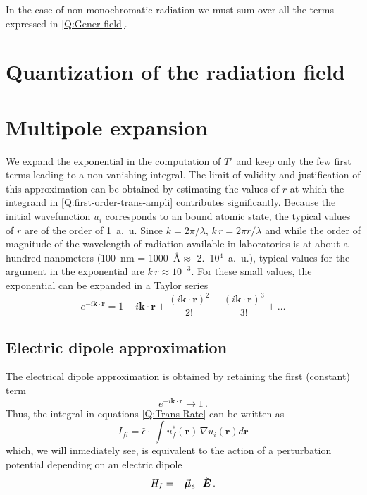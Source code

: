 In the case of non-monochromatic radiation we must sum over all the terms expressed in \ref{Q:Gener-field}.

\section{Quantization of the radiation field}


\section{Multipole expansion}
\label{S:Multi-expan}

We expand the exponential in the computation of $T'$ and keep only the few first terms leading to a non-vanishing integral. The limit of validity and justification of this approximation can be obtained by estimating the values of $r$ at which the integrand in \ref{Q:first-order-trans-ampli} contributes significantly.  
%
Because the initial wavefunction $u_{i}$ corresponds to an bound atomic state, the typical values of $r$ are of the order of 1~a.~u. Since $k = 2 \pi/\lambda$, $k\,r = 2 \pi r/ \lambda$ and while the order of magnitude of the wavelength of radiation available in laboratories is at about a hundred nanometers (100~nm = 1000~\AA $\approx$ 2.~10$^{4}$~a.~u.), typical values for the argument in the exponential are $k\,r\approx 10^{-3}$. For these small values, the exponential can be expanded in a Taylor series
\[
e^{-i \bm{k} \cdot \bm{r}} = 1 - i \bm{k} \cdot \bm{r} + \frac{\left( i \bm{k} \cdot \bm{r}\right)^{2}}{2!} - \frac{\left(
i \bm{k} \cdot \bm{r}\right)^{3}}{3!} + \dots
\]

\subsection{Electric dipole approximation}

The electrical dipole approximation is obtained by retaining the first (constant) term
\[ e^{-i \bm{k} \cdot \bm{r}} \to 1 \, . \]
%
Thus, the integral in equations \ref{Q:Trans-Rate} can be written as
%
\[
I_{fi} = \hat{\epsilon}  \cdot \, \int u^{*}_{f}(\bm{r}) \, \nabla u_{i}(\bm{r}) d \bm{r}
\]
%
which, we will inmediately see, is equivalent to the action of a perturbation potential depending on an electric dipole
\begin{equation}\label{Q:dipol-approx-pertur-1}
  H_{I} = - \vec{\boldsymbol{\mu}}_{e}  \cdot \breve{\bm{E}} \, .
\end{equation}


